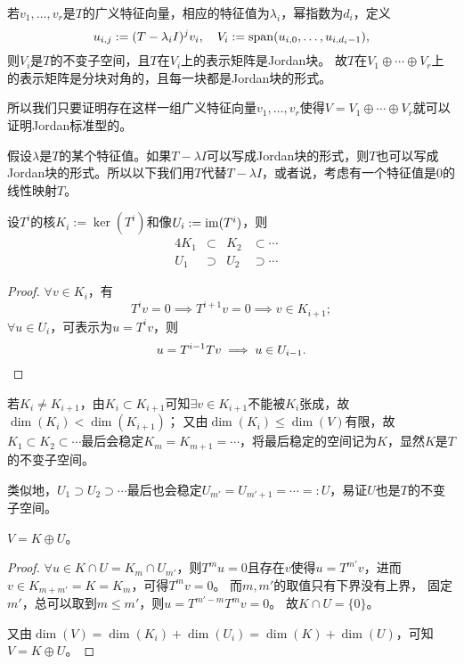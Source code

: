 \begin{corollary}
	若$v_1,\ldots,v_r$是$T$的广义特征向量，相应的特征值为$\lambda_i$，幂指数为$d_i$，定义
	\[
		u_{i,j}:=(T-\lambda_iI)^jv_i,\quad V_i:=\operatorname{span}(u_{i,0},\ldots,u_{i,d_i-1}),
	\]
	则$V_i$是$T$的不变子空间，且$T$在$V_i$上的表示矩阵是Jordan块。
	故$T$在$V_1\oplus\cdots\oplus V_r$上的表示矩阵是分块对角的，且每一块都是Jordan块的形式。

	所以我们只要证明存在这样一组广义特征向量$v_1,\ldots,v_r$使得$V=V_1\oplus\cdots\oplus V_r$就可以证明Jordan标准型的。
\end{corollary}

\begin{remark}
	假设$\lambda$是$T$的某个特征值。如果$T-\lambda I$可以写成Jordan块的形式，则$T$也可以写成Jordan块的形式。所以以下我们用$T$代替$T-\lambda I$，或者说，考虑有一个特征值是0的线性映射$T$。
\end{remark}

\begin{theorem}{}{}
	设$T^i$的核$K_i:=\ker(T^i)$和像$U_i:=\operatorname{im}(T^i)$，则
	\begin{alignat*}{4}
		K_1&\subset{}&K_2&\subset\cdots&\\
		U_1&\supset{}&U_2&\supset\cdots&
	\end{alignat*}
\end{theorem}

\begin{proof}
	$\forall v\in K_i$，有 
	\[
		T^iv=0\implies T^{i+1}v=0\implies v\in K_{i+1};
	\]
	$\forall u\in U_i$，可表示为$u=T^iv$，则
	\[
		u=T^{i-1}Tv\implies u\in U_{i-1}.
		\qedhere
	\]
\end{proof} 

\begin{corollary}
	若$K_i\neq K_{i+1}$，由$K_i\subset K_{i+1}$可知$\exists v\in K_{i+1}$不能被$K_i$张成，故$\dim(K_i)<\dim(K_{i+1})$；
	又由$\dim(K_i)\leq \dim(V)$有限，故$K_1\subset K_2\subset\cdots$最后会稳定$K_m=K_{m+1}=\cdots$，将最后稳定的空间记为$K$，显然$K$是$T$的不变子空间。

	类似地，$U_1\supset U_2\supset\cdots$最后也会稳定$U_{m'}=U_{m'+1}=\cdots=:U$，易证$U$也是$T$的不变子空间。
\end{corollary}

\begin{theorem}
	{}{}
	$V=K\oplus U$。
\end{theorem}

\begin{proof}
	$\forall u\in K\cap U=K_m\cap U_{m'}$，则$T^mu=0$且存在$v$使得$u=T^{m'}v$，进而$v\in K_{m+m'}=K=K_m$，可得$T^mv=0$。
	而$m,m'$的取值只有下界没有上界，
	固定$m'$，总可以取到$m\leq m'$，则$u=T^{m'-m}T^mv=0$。
	故$K\cap U=\{0\}$。

	又由$\dim(V)=\dim(K_i)+\dim(U_i)=\dim(K)+\dim(U)$，可知$V=K\oplus U$。
\end{proof}

